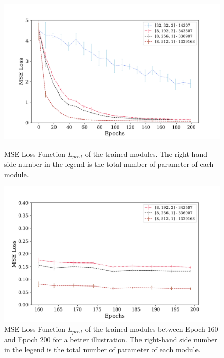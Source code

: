         \begin{figure}[hbtp]
                \centering
                \includegraphics[width=15cm, keepaspectratio]{images/results/module_scalability_1.png}
                \caption{MSE Loss Function $L_{pred}$ of the trained modules. The right-hand side number in the legend is the total number of parameter of each module.}
                \label{fig:results_scalability_1}
                
                \vspace{1.0cm}
                
                \includegraphics[width=15cm, keepaspectratio]{images/results/module_scalability_2.png}
                \caption{MSE Loss Function $L_{pred}$ of the trained modules between Epoch 160 and Epoch 200 for a better illustration. The right-hand side number in the legend is the total number of parameter of each module.}
                \label{fig:results_scalability_2}
        \end{figure}
        
